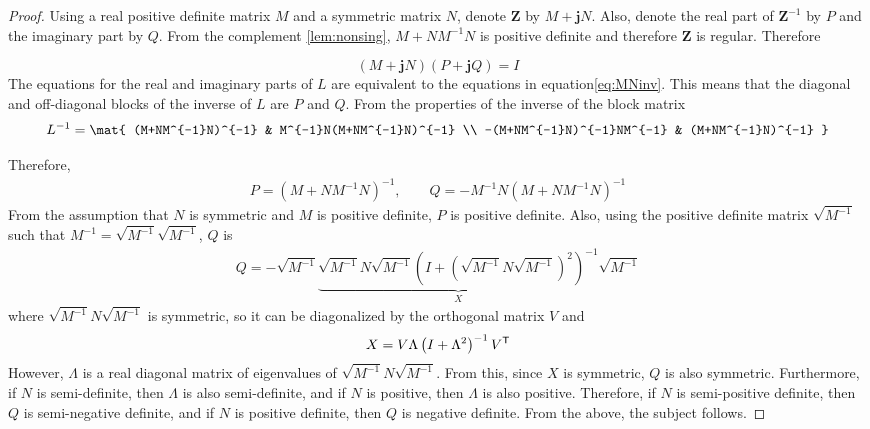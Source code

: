 \documentclass[graybox, envcountchap]{svmult}
\begin{document}
\begin{proof}
Using a real positive definite matrix $M$ and a symmetric matrix $N$, denote $\bm{Z}$ by $M+ \bm{j} N$.
Also, denote the real part of $\bm{Z}^{-1}$ by $P$ and the imaginary part by $Q$.
From the complement \ref{lem:nonsing}, $M+NM^{-1}N$ is positive definite and therefore $\bm{Z}$ is regular.
Therefore

\[
(M+ \bm{j} N)(P+ \bm{j} Q)=I
\]
The equations for the real and imaginary parts of $L$ are equivalent to the equations in equation\ref{eq:MNinv}.
This means that the diagonal and off-diagonal blocks of the inverse of $L$ are $P$ and $Q$.
From the properties of the inverse of the block matrix
\begin{align*}
L^{-1}=
\mat{
(M+NM^{-1}N)^{-1} & M^{-1}N(M+NM^{-1}N)^{-1} \\
-(M+NM^{-1}N)^{-1}NM^{-1} & (M+NM^{-1}N)^{-1}
}
\end{align*}

Therefore,
\begin{align*}
P=(M+NM^{-1}N)^{-1},\qquad
Q=-M^{-1}N(M+NM^{-1}N)^{-1}
\end{align*}
From the assumption that $N$ is symmetric and $M$ is positive definite, $P$ is positive definite.
Also, using the positive definite matrix $\sqrt{M^{-1}}$ such that $M^{-1}=\sqrt{M^{-1}}\sqrt{M^{-1}}$, $Q$ is
\begin{align*}
Q=-\sqrt{M^{-1}} 
\underbrace{
\sqrt{M^{-1}} N \sqrt{M^{-1}}
\left(
I + (\sqrt{M^{-1}} N \sqrt{M^{-1}} )^2
\right)^{-1}
}_{X}
\sqrt{M^{-1}}
\end{align*}
where $\sqrt{M^{-1}} N \sqrt{M^{-1}}$ is symmetric, so it can be diagonalized by the orthogonal matrix $V$ and
\begin{align*}
X = V \Lambda \left(
I + \Lambda^2
\right)^{-1}
V^{\sf T}
\end{align*}
However, $\Lambda$ is a real diagonal matrix of eigenvalues of $\sqrt{M^{-1}} N \sqrt{M^{-1}}$.
From this, since $X$ is symmetric, $Q$ is also symmetric.
Furthermore, if $N$ is semi-definite, then $\Lambda$ is also semi-definite, and if $N$ is positive, then $\Lambda$ is also positive.
Therefore, if $N$ is semi-positive definite, then $Q$ is semi-negative definite, and if $N$ is positive definite, then $Q$ is negative definite.
From the above, the subject follows.
\end{proof}
\end{document}
